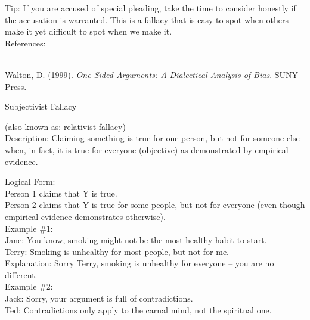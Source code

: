 \documentclass[a4paper,12pt,single,pdftex]{scrartcl}
\begin{document}
{    
      Tip: If you are accused of special pleading, take the time to consider honestly if the accusation is warranted.  This is a fallacy that is easy to spot when others make it yet difficult to spot when we make it.
    \\

    References:

    
      
        
      \\

      
        
          Walton, D. (1999). {\it One-Sided Arguments: A Dialectical Analysis of Bias}. SUNY Press.
        
      
    
  }


Subjectivist Fallacy
    
      (also known as: relativist fallacy)
    \\

  
    Description: Claiming something is true for one person, but not for someone else when, in fact, it is true for everyone (objective) as demonstrated by empirical evidence.

    
      Logical Form:
    \\

    
      Person 1 claims that Y is true.
    \\

    
      Person 2 claims that Y is true for some people, but not for everyone (even though empirical evidence demonstrates otherwise).
    \\

    
      Example \#1:
    \\

    
      Jane: You know, smoking might not be the most healthy habit to start.
    \\

    
      Terry: Smoking is unhealthy for most people, but not for me.
    \\

    
      Explanation: Sorry Terry, smoking is unhealthy for everyone -- you are no different.
    \\

    
      Example \#2:
    \\

    
      Jack: Sorry, your argument is full of contradictions.
    \\

    
      Ted: Contradictions only apply to the carnal mind, not the spiritual one.
    \\
\end{document}
